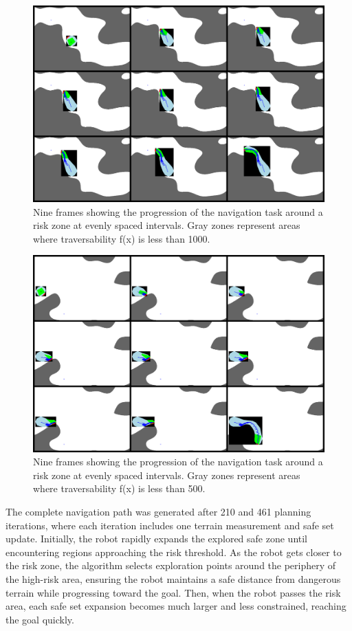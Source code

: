 \begin{figure}[h]
    \centering
    \includegraphics[width=1\linewidth]{figures/navigation.png}
    \caption{Nine frames showing the progression of the navigation task around a risk zone at evenly spaced intervals. Gray zones represent areas where traversability f(x) is less than 1000.}
    \label{fig:navigation}
\end{figure}

\begin{figure}[h]
    \centering
    \includegraphics[width=1\linewidth]{figures/navigation2.png}
    \caption{Nine frames showing the progression of the navigation task around a risk zone at evenly spaced intervals. Gray zones represent areas where traversability f(x) is less than 500.}
    \label{fig:navigation2}
\end{figure}

The complete navigation path was generated after 210 and 461 planning iterations, where each iteration includes one terrain measurement and safe set update. Initially, the robot rapidly expands the explored safe zone until encountering regions approaching the risk threshold. As the robot gets closer to the risk zone, the algorithm selects exploration points around the periphery of the high-risk area, ensuring the robot maintains a safe distance from dangerous terrain while progressing toward the goal. Then, when the robot passes the risk area, each safe set expansion becomes much larger and less constrained, reaching the goal quickly. 

